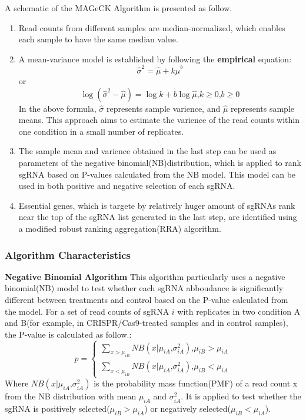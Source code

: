 \documentclass[fleqn,10pt]{wlscirep}
\begin{document}
A schematic of the MAGeCK Algorithm is presented as follow\cite{li2014mageck}.
\begin{enumerate}
    \item Read counts from different samples are median-normalized, which enables each sample to have the same median value.
    \item A mean-variance model is established by following the \textbf{empirical} equation:
        \begin{equation}
           \hat{\sigma}^2=\hat{\mu}+k\hat{\mu}^b
        \end{equation}
        or
        \begin{equation}
            \log{(\hat{\sigma}^2-\hat{\mu})}=\log{k}+b\log{\hat{\mu}}\textrm{,} k\geqslant{0} \textrm{,}b\geqslant{0}
         \end{equation}
        In the above formula, $\hat{\sigma}$ represents sample varience, and $\hat{\mu}$ represents sample means.  This approach aims to estimate the varience of the read counts within one condition in a small number of replicates.
    \item The sample mean and varience obtained in the last step can be used as parameters of the negative binomial(NB)distribution, which is applied to rank sgRNA based on P-values calculated from the NB model.  This model can be used in both positive and negative selection of each sgRNA.
    \item Essential genes, which is targete by relatively huger amount of sgRNAs rank near the top of the sgRNA list generated in the last step, are identified using a modified robust ranking aggregation(RRA) algorithm.
    \end{enumerate}

\subsubsection*{Algorithm Characteristics}
\textbf{Negative Binomial Algorithm}
This algorithm particularly uses a negative binomial(NB) model to test whether each sgRNA abboudance is significantly different between treatments and control based on the P-value calculated from the model\cite{li2014mageck}. 
For a set of read counts of sgRNA $i$ with replicates in two condition A and B(for example, in CRISPR/Cas9-treated samples and in control samples), the P-value is calculated as follow\cite{li2014mageck}.:
\begin{equation}
    p=\left\{
\begin{aligned}
\sum_{x>\mu_{iB}}NB(x|\mu_{iA}\textrm{,}\sigma^2_{iA}) \textrm{,}\mu_{iB}>\mu_{iA}\\
\sum_{x<\mu_{iB}}NB(x|\mu_{iA}\textrm{,}\sigma^2_{iA}) \textrm{,}\mu_{iB}<\mu_{iA} 
\end{aligned}
\right.
\end{equation}
Where $NB(x|\mu_{iA}\textrm{,}\sigma^2_{iA})$ is the probability mass function(PMF) of a read count x from the NB distribution with mean $\mu_{iA}$ and $\sigma^2_{iA}$. It is applied to test whether the sgRNA is positively selected($\mu_{iB}>\mu_{iA}$) or negatively selected($\mu_{iB}<\mu_{iA}$).
\end{document}
